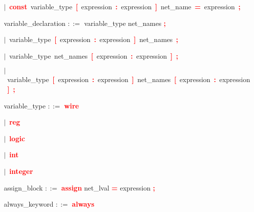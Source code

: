 \mbox{$|$ \textbf{\textcolor{red}{const}} variable\_type \textbf{\textcolor{red}{[}} expression \textbf{\textcolor{red}{:}} expression \textbf{\textcolor{red}{]}} net\_name \textbf{\textcolor{red}{=}} expression \textbf{\textcolor{red}{;}}}

\vspace{1em}
\noindent
\settowidth{\parindent}{\hspace{4ex}}
variable\_declaration $::=$\hspace{1ex} variable\_type net\_names \textbf{\textcolor{red}{;}}

\mbox{$|$ variable\_type \textbf{\textcolor{red}{[}} expression \textbf{\textcolor{red}{:}} expression \textbf{\textcolor{red}{]}} net\_names \textbf{\textcolor{red}{;}}}

\mbox{$|$ variable\_type net\_names \textbf{\textcolor{red}{[}} expression \textbf{\textcolor{red}{:}} expression \textbf{\textcolor{red}{]}} \textbf{\textcolor{red}{;}}}

\mbox{$|$ variable\_type \textbf{\textcolor{red}{[}} expression \textbf{\textcolor{red}{:}} expression \textbf{\textcolor{red}{]}} net\_names \textbf{\textcolor{red}{[}} expression \textbf{\textcolor{red}{:}} expression \textbf{\textcolor{red}{]}} \textbf{\textcolor{red}{;}}}

\vspace{1em}
\noindent
\settowidth{\parindent}{\hspace{4ex}}
variable\_type $::=$\hspace{1ex} \textbf{\textcolor{red}{wire}}

\mbox{$|$ \textbf{\textcolor{red}{reg}}}

\mbox{$|$ \textbf{\textcolor{red}{logic}}}

\mbox{$|$ \textbf{\textcolor{red}{int}}}

\mbox{$|$ \textbf{\textcolor{red}{integer}}}

\vspace{1em}
\noindent
\settowidth{\parindent}{\hspace{4ex}}
assign\_block $::=$\hspace{1ex} \textbf{\textcolor{red}{assign}} net\_lval \textbf{\textcolor{red}{=}} expression \textbf{\textcolor{red}{;}}

\vspace{1em}
\noindent
\settowidth{\parindent}{\hspace{4ex}}
always\_keyword $::=$\hspace{1ex} \textbf{\textcolor{red}{always}}

